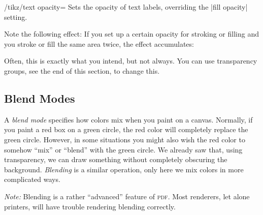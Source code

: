 \begin{key}{/tikz/text opacity=}
    Sets the opacity of text labels, overriding the |fill opacity| setting.
\begin{codeexample}[]
\end{codeexample}
\end{key}

Note the following effect: If you set up a certain opacity for stroking or
filling and you stroke or fill the same area twice, the effect accumulates:
%
\begin{codeexample}[]
\end{codeexample}

Often, this is exactly what you intend, but not always. You can use
transparency groups, see the end of this section, to change this.


\subsection{Blend Modes}
\label{section-blend-modes}

A \emph{blend mode} specifies how colors mix when you paint on a canvas.
Normally, if you paint a red box on a green circle, the red color will
completely replace the green circle. However, in some situations you might also
wish the red color to somehow ``mix'' or ``blend'' with the green circle. We
already saw that, using transparency, we can draw something without completely
obscuring the background. \emph{Blending} is a similar operation, only here we
mix colors in more complicated ways.

\emph{Note:} Blending is a rather ``advanced'' feature of \textsc{pdf}. Most
renderers, let alone printers, will have trouble rendering blending correctly.

